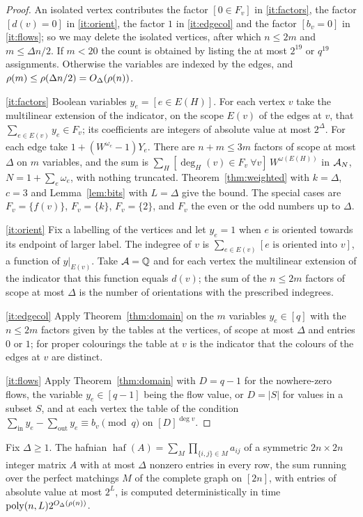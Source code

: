 \begin{proof}
An isolated vertex contributes the factor $[0\in F_v]$ in \ref{it:factors},
the factor $[d(v)=0]$ in \ref{it:orient}, the factor $1$ in \ref{it:edgecol} and
the factor $[b_v=0]$ in \ref{it:flows}; so we may delete the isolated vertices,
after which $n\le 2m$ and $m\le\Delta n/2$. If $m<20$ the count is obtained by
listing the at most $2^{19}$ or $q^{19}$ assignments. Otherwise the variables are
indexed by the edges, and $\rho(m)\le\rho(\Delta n/2)=O_\Delta(\rho(n))$.

\ref{it:factors} Boolean variables $y_e=[e\in E(H)]$. For each vertex $v$ take
the multilinear extension of the indicator, on the scope $E(v)$ of the edges at
$v$, that $\sum_{e\in E(v)}y_e\in F_v$; its coefficients are integers of absolute
value at most $2^{\Delta}$. For each edge take $1+(W^{\omega_e}-1)Y_e$. There are
$n+m\le 3m$ factors of scope at most $\Delta$ on $m$ variables, and the sum is
$\sum_H[\deg_H(v)\in F_v\ \forall v]\,W^{\omega(E(H))}$ in $\mathcal{A}_N$,
$N=1+\sum_e\omega_e$, with nothing truncated. Theorem~\ref{thm:weighted} with
$k=\Delta$, $c=3$ and Lemma~\ref{lem:bits} with $L=\Delta$ give the bound. The
special cases are $F_v=\{f(v)\}$, $F_v=\{k\}$, $F_v=\{2\}$, and $F_v$ the even or
the odd numbers up to $\Delta$.

\ref{it:orient} Fix a labelling of the vertices and let $y_e=1$ when $e$ is
oriented towards its endpoint of larger label. The indegree of $v$ is
$\sum_{e\in E(v)}[\text{$e$ is oriented into $v$}]$, a function of $y|_{E(v)}$.
Take $\mathcal{A}=\mathbb{Q}$ and for each vertex the multilinear extension of the indicator
that this function equals $d(v)$; the sum of the $n\le 2m$ factors of scope at
most $\Delta$ is the number of orientations with the prescribed indegrees.

\ref{it:edgecol} Apply Theorem~\ref{thm:domain} on the $m$ variables
$y_e\in[q]$ with the $n\le 2m$ factors given by the tables at the vertices, of
scope at most $\Delta$ and entries $0$ or $1$; for proper colourings the table
at $v$ is the indicator that the colours of the edges at $v$ are distinct.

\ref{it:flows} Apply Theorem~\ref{thm:domain} with $D=q-1$ for the nowhere-zero
flows, the variable $y_e\in[q-1]$ being the flow value, or $D=|S|$ for values in
a subset $S$, and at each vertex the table of the condition
$\sum_{\text{in}}y_e-\sum_{\text{out}}y_e\equiv b_v\pmod q$ on $[D]^{\deg v}$.
\end{proof}

\begin{corollary}[Hafnians]\label{cor:hafnian}
Fix $\Delta\ge1$. The hafnian
$\operatorname{haf}(A)=\sum_{M}\prod_{\{i,j\}\in M}a_{ij}$ of a symmetric
$2n\times 2n$ integer matrix $A$ with at most $\Delta$ nonzero entries in every
row, the sum running over the perfect matchings $M$ of the complete graph on
$[2n]$, with entries of absolute value at most $2^L$, is computed
deterministically in time $\operatorname{poly}(n,L)2^{O_\Delta(\rho(n))}$.
\end{corollary}

